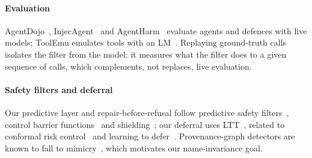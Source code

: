 \paragraph{Evaluation}
AgentDojo~\cite{agentdojo}, InjecAgent~\cite{injecagent} and AgentHarm~\cite{agentharm} evaluate agents and defences with live models; ToolEmu emulates tools with an LM~\cite{toolemu}. Replaying ground-truth calls isolates the filter from the model: it measures what the filter does to a given sequence of calls, which complements, not replaces, live evaluation.

\paragraph{Safety filters and deferral}
Our predictive layer and repair-before-refusal follow predictive safety filters~\cite{wabersich,hsu}, control barrier functions~\cite{ames} and shielding~\cite{shielding}; our deferral uses LTT~\cite{ltt}, related to conformal risk control~\cite{crc} and learning to defer~\cite{madras,mozannar,knowno}. Provenance-graph detectors are known to fall to mimicry~\cite{goyal}, which motivates our name-invariance goal.
